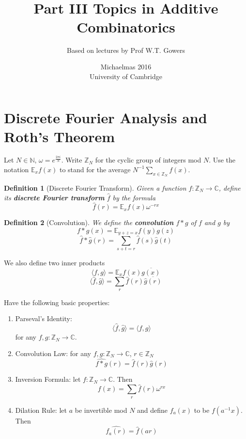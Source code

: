 \documentclass[a4paper]{article}
\title{Part III Topics in Additive Combinatorics}
\author{Based on lectures by Prof W.T. Gowers}
\date{Michaelmas 2016\\University of Cambridge}
\newtheorem*{definition}{Definition}
\newcommand*\conj[1]{\overline{#1}}
\begin{document}
\maketitle
\tableofcontents

\section{Discrete Fourier Analysis and Roth's Theorem}
Let $N\in\mathbb{N}$, $\omega = e^{\frac{2\pi i}{N}}$. Write $\mathbb{Z}_N$ for the cyclic group of integers mod $N$. Use the notation $\mathbb{E}_xf(x)$ to stand for the average $N^{-1}\sum_{x\in\mathbb{Z}_N}f(x)$.

\begin{definition}[Discrete Fourier Transform]
	Given a function $f: \mathbb{Z}_N \to \mathbb{C}$, define its \textbf{discrete Fourier transform} $\hat{f}$ by the formula $$\hat{f}(r)=\mathbb{E}_xf(x)\omega^{-rx}$$
\end{definition}

\begin{definition}[Convolution]
	We define the \textbf{convolution} $f * g$ of $f$ and $g$ by $$f*g(x) = \mathbb{E}_{y+z=x}f(y)g(z)$$
	$$\hat{f}*\hat{g}(r) = \sum_{s+t=r}\hat{f}(s)\hat{g}(t)$$
\end{definition}

We also define two inner products
$$\langle f,g \rangle = \mathbb{E}_xf(x)\conj{g(x)}$$
$$\langle \hat{f}, \hat{g} \rangle = \sum_r \hat{f}(r)\conj{\hat{g}(r)}$$

Have the following basic properties:
\begin{enumerate}
	\item Parseval's Identity: $$\langle \hat{f}, \hat{g} \rangle = \langle f, g \rangle$$ for any $f, g: \mathbb{Z}_N \to \mathbb{C}$.
	
	\item Convolution Law: for any $f,g:\mathbb{Z}_N \to \mathbb{C}$, $r \in \mathbb{Z}_N$ $$\widehat{f*g}(r) = \hat{f}(r)\hat{g}(r)$$
	
	\item Inversion Formula: let $f:\mathbb{Z}_N\to\mathbb{C}$. Then $$f(x)=\sum_r \hat{f}(r)\omega^{rx}$$
	
	\item Dilation Rule: let $a$ be invertible mod $N$ and define $f_a(x)$ to be $f(a^{-1}x)$. Then $$\hat{f_a(r)} = \hat{f}(ar)$$
\end{enumerate}
\end{document}
